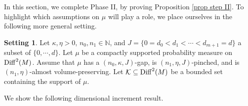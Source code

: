 \documentclass[11pt, leqno, fleqn]{amsart}
\def\cU{\mathfrak U}
\def\eps{\varepsilon}
\def \N{{\mathbb N}}
\newcommand{\cP}{{\mathcal P}}
\newcommand{\cK}{{\mathcal K}}
\theoremstyle{definition}
\newtheorem{setting}[thm]{\bf Setting}
\theoremstyle{definition}
\def\supp{{\rm supp}}
\def \vol{  {\rm vol} }
\newcommand{\Diff}{{\rm Diff}}
\begin{document}
In this section, we complete Phase II, by proving Proposition \ref{prop step II}. To highlight which assumptions on $\mu$ will play a role, we place ourselves in  the following more general setting.

     	\begin{setting}\label{Setting-bootstrap}
	Let $\kappa, \eta> 0$, $n_{0}, n_{1}\in \N$, and  $J = \{  0 = d_0 < d_1 <   \cdots <  d_{m+1} = d \}$  a subset of $ \{0, \cdots, d \}$. 
	Let $\mu$ be a compactly supported  probability measure on $\Diff^2(M)$. Assume  that
	$\mu$  has a  $(n_{0}, \kappa, J)$-gap, is $(n_{1},\eta, J)$-pinched, and is $(n_{1},\eta)$-almost volume-preserving.
	Let $\cK\subseteq \Diff^2(M)$ be a bounded  set containing the support of $\mu$.
	\end{setting}



		  
		  
		  
 
		 		  
		 
		   We show the following   dimensional increment result.
		 
\end{document}
